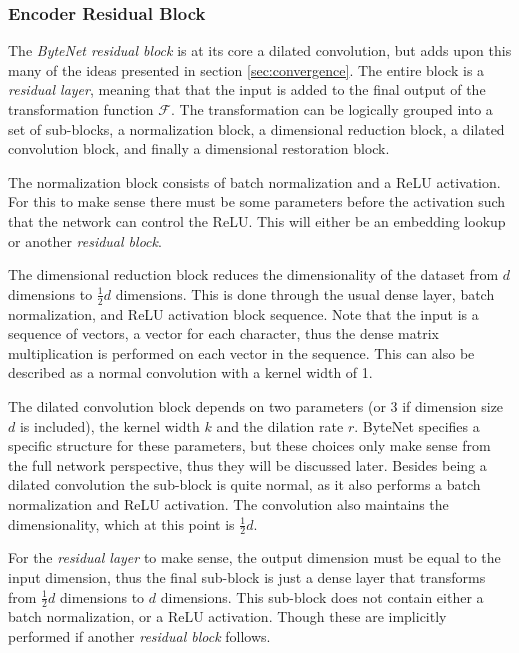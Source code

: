 \subsubsection{Encoder Residual Block}

The \textit{ByteNet residual block} is at its core a dilated convolution, but adds upon this many of the ideas presented in section \ref{sec:convergence}. The entire block is a \textit{residual layer}, meaning that that the input is added to the final output of the transformation function $\mathcal{F}$. The transformation can be logically grouped into a set of sub-blocks, a normalization block, a dimensional reduction block, a dilated convolution block, and finally a dimensional restoration block.

The normalization block consists of batch normalization and a ReLU activation. For this to make sense there must be some parameters before the activation such that the network can control the ReLU. This will either be an embedding lookup or another \textit{residual block}.

The dimensional reduction block reduces the dimensionality of the dataset from $d$ dimensions to $\frac{1}{2}d$ dimensions. This is done through the usual dense layer, batch normalization, and ReLU activation block sequence. Note that the input is a sequence of vectors, a vector for each character, thus the dense matrix multiplication is performed on each vector in the sequence. This can also be described as a normal convolution with a kernel width of 1.

\afterpage{\clearpage}

The dilated convolution block depends on two parameters (or 3 if dimension size $d$ is included), the kernel width $k$ and the dilation rate $r$. ByteNet specifies a specific structure for these parameters, but these choices only make sense from the full network perspective, thus they will be discussed later. Besides being a dilated convolution the sub-block is quite normal, as it also performs a batch normalization and ReLU activation. The convolution also maintains the dimensionality, which at this point is $\frac{1}{2}d$.

For the \textit{residual layer} to make sense, the output dimension must be equal to the input dimension, thus the final sub-block is just a dense layer that transforms from $\frac{1}{2}d$ dimensions to $d$ dimensions. This sub-block does not contain either a batch normalization, or a ReLU activation. Though these are implicitly performed if another \textit{residual block} follows.

